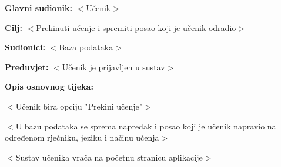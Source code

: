 					\noindent {}
					\begin{packed_item}
	
						\item \textbf{Glavni sudionik: }$<$Učenik$>$
						\item  \textbf{Cilj:} $<$Prekinuti učenje i spremiti posao koji je učenik odradio$>$
						\item  \textbf{Sudionici:} $<$Baza podataka$>$
						\item  \textbf{Preduvjet:} $<$Učenik je prijavljen u sustav$>$
						\item  \textbf{Opis osnovnog tijeka:}
						
						\item[] \begin{packed_enum}
	
							\item $<$Učenik bira opciju "Prekini učenje"$>$
							\item $<$U bazu podataka se sprema napredak i posao koji je učenik napravio na određenom rječniku, jeziku i načinu učenja$>$
							\item $<$Sustav učenika vrača na početnu stranicu aplikacije$>$
						\end{packed_enum}
						
					\end{packed_item}

